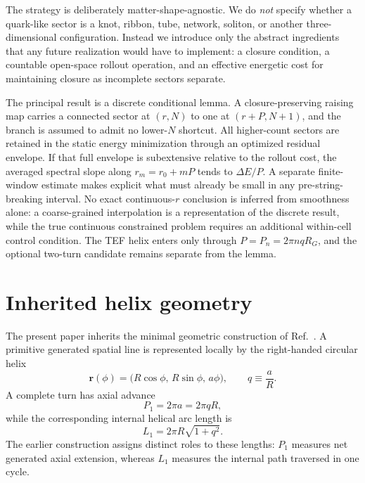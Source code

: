 \documentclass[10pt]{article}
\begin{document}
The strategy is deliberately matter-shape-agnostic. We do \emph{not} specify whether a quark-like sector is a knot, ribbon, tube, network, soliton, or another three-dimensional configuration. Instead we introduce only the abstract ingredients that any future realization would have to implement: a closure condition, a countable open-space rollout operation, and an effective energetic cost for maintaining closure as incomplete sectors separate.

The principal result is a discrete conditional lemma. A closure-preserving raising map carries a connected sector at $(r,N)$ to one at $(r+P,N+1)$, and the branch is assumed to admit no lower-$N$ shortcut. All higher-count sectors are retained in the static energy minimization through an optimized residual envelope. If that full envelope is subextensive relative to the rollout cost, the averaged spectral slope along $r_m=r_0+mP$ tends to $\Delta E/P$. A separate finite-window estimate makes explicit what must already be small in any pre-string-breaking interval. No exact continuous-$r$ conclusion is inferred from smoothness alone: a coarse-grained interpolation is a representation of the discrete result, while the true continuous constrained problem requires an additional within-cell control condition. The TEF helix enters only through $P=P_n=2\pi nqR_G$, and the optional two-turn candidate remains separate from the lemma.

\section{Inherited helix geometry}
\label{sec:inherited}

The present paper inherits the minimal geometric construction of Ref.~\cite{WuWeakMixing}.  A primitive generated spatial line is represented locally by the right-handed circular helix
\begin{equation}
\bm r(\phi)=\bigl(R\cos\phi,\,R\sin\phi,\,a\phi\bigr),
\qquad q\equiv\frac{a}{R}.
\label{eq:helix}
\end{equation}
A complete turn has axial advance
\begin{equation}
P_1=2\pi a=2\pi qR,
\label{eq:p1}
\end{equation}
while the corresponding internal helical arc length is
\begin{equation}
L_1=2\pi R\sqrt{1+q^2}.
\label{eq:l1}
\end{equation}
The earlier construction assigns distinct roles to these lengths: $P_1$ measures net generated axial extension, whereas $L_1$ measures the internal path traversed in one cycle.
\end{document}
